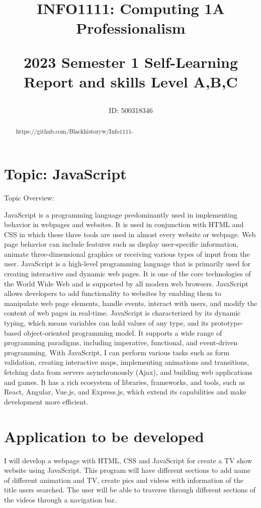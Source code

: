 \documentclass{article}
\title{INFO1111: Computing 1A Professionalism

2023 Semester 1 Self-Learning Report and skills
Level A,B,C
}
\author{ID:  500318346}
\begin{document}
\maketitle

\begin{abstract}
https://github.com/Blackhistoryw/Info1111-
\end{abstract}

\section{Topic: JavaScript}

Topic Overview:

JavaScript is a programming language predominantly used in implementing behavior in webpages and websites. It is used in conjunction with HTML and CSS in which these three tools are used in almost every website or webpage. Web page behavior can include features such as display user-specific information, animate three-dimensional graphics or receiving various types of input from the user. JavaScript is a high-level programming language that is primarily used for creating interactive and dynamic web pages. It is one of the core technologies of the World Wide Web and is supported by all modern web browsers. JavaScript allows developers to add functionality to websites by enabling them to manipulate web page elements, handle events, interact with users, and modify the content of web pages in real-time. JavaScript is characterized by its dynamic typing, which means variables can hold values of any type, and its prototype-based object-oriented programming model. It supports a wide range of programming paradigms, including imperative, functional, and event-driven programming. With JavaScript, I can perform various tasks such as form validation, creating interactive maps, implementing animations and transitions, fetching data from servers asynchronously (Ajax), and building web applications and games. It has a rich ecosystem of libraries, frameworks, and tools, such as React, Angular, Vue.js, and Express.js, which extend its capabilities and make development more efficient.


\section{Application to be developed}

I will develop a webpage with HTML, CSS and JavaScript for create a TV show website using JavaScript. This program will have different sections to add name of different animation and TV, create pics and videos with information of the title users searched. The user will be able to traverse through different sections of the videos through a navigation bar.
\end{document}
